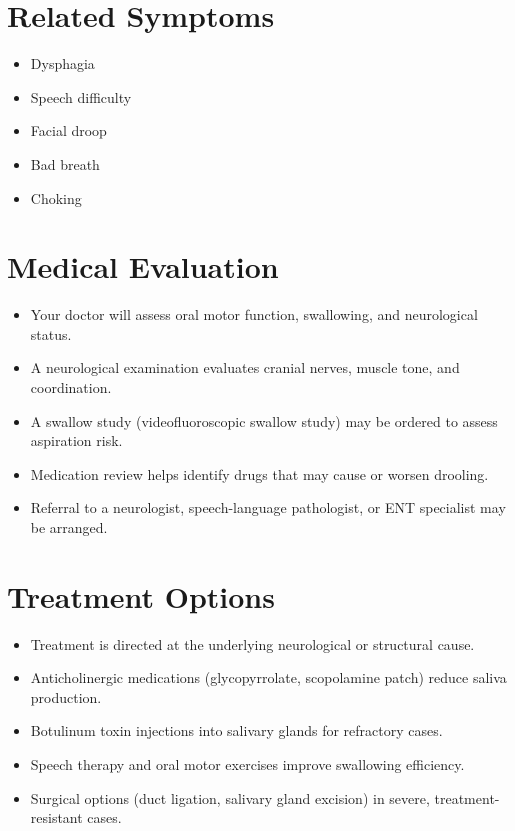 \section*{Related Symptoms}
\begin{itemize}
  \item Dysphagia
  \item Speech difficulty
  \item Facial droop
  \item Bad breath
  \item Choking
\end{itemize}

\section*{Medical Evaluation}
\begin{itemize}
  \item Your doctor will assess oral motor function, swallowing, and neurological status.
  \item A neurological examination evaluates cranial nerves, muscle tone, and coordination.
  \item A swallow study (videofluoroscopic swallow study) may be ordered to assess aspiration risk.
  \item Medication review helps identify drugs that may cause or worsen drooling.
  \item Referral to a neurologist, speech-language pathologist, or ENT specialist may be arranged.
\end{itemize}

\section*{Treatment Options}
\begin{itemize}
  \item Treatment is directed at the underlying neurological or structural cause.
  \item Anticholinergic medications (glycopyrrolate, scopolamine patch) reduce saliva production.
  \item Botulinum toxin injections into salivary glands for refractory cases.
  \item Speech therapy and oral motor exercises improve swallowing efficiency.
  \item Surgical options (duct ligation, salivary gland excision) in severe, treatment-resistant cases.
\end{itemize}

